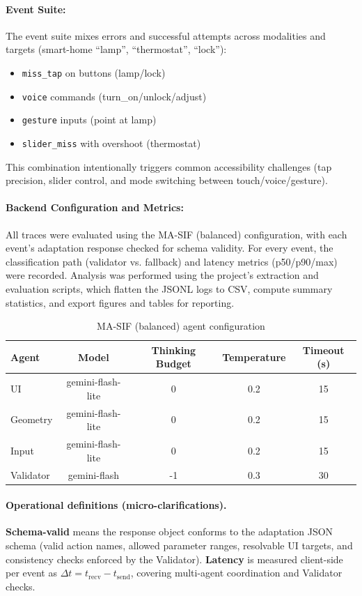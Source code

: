 \documentclass[openany]{book}
\begin{document}
\paragraph{Event Suite:}
The event suite mixes errors and successful attempts across modalities and targets (smart-home “lamp”, “thermostat”, “lock”):
\begin{itemize}
    \item \texttt{miss\_tap} on buttons (lamp/lock)
    \item \texttt{voice} commands (turn\_on/unlock/adjust)
    \item \texttt{gesture} inputs (point at lamp)
    \item \texttt{slider\_miss} with overshoot (thermostat)
\end{itemize}
This combination intentionally triggers common accessibility challenges (tap precision, slider control, and mode switching between touch/voice/gesture).

\paragraph{Backend Configuration and Metrics:} 
All traces were evaluated using the MA-SIF (balanced) configuration, with each event’s adaptation response checked for schema validity. For every event, the classification path (validator vs. fallback) and latency metrics (p50/p90/max) were recorded. Analysis was performed using the project’s extraction and evaluation scripts, which flatten the JSONL logs to CSV, compute summary statistics, and export figures and tables for reporting.
\begin{table}[htb]
\centering
\caption{MA-SIF (balanced) agent configuration}
\label{tab:ma-sif-config}
\begin{tabular}{lcccc}
\toprule
\textbf{Agent} & \textbf{Model} & \textbf{Thinking Budget} & \textbf{Temperature} & \textbf{Timeout (s)} \\
\midrule
UI         & gemini-flash-lite & 0   & 0.2 & 15 \\
Geometry   & gemini-flash-lite & 0   & 0.2 & 15 \\
Input      & gemini-flash-lite & 0   & 0.2 & 15 \\
Validator  & gemini-flash      & -1  & 0.3 & 30 \\
\bottomrule
\end{tabular}
\end{table}

\paragraph{Operational definitions (micro-clarifications).}
\textbf{Schema-valid} means the response object conforms to the adaptation JSON schema (valid action names, allowed parameter ranges, resolvable UI targets, and consistency checks enforced by the Validator). 
\textbf{Latency} is measured client-side per event as $\Delta t = t_{\text{recv}} - t_{\text{send}}$, covering multi-agent coordination and Validator checks.
\end{document}
